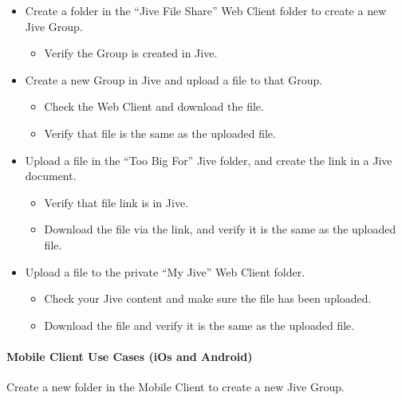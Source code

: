 \documentclass[letterpaper,10pt,english]{sphinxmanual}
\begin{document}
\begin{itemize}
\item {} 
Create a folder in the “Jive File Share” Web Client folder to create a new Jive Group.
\begin{itemize}
\item {} 
Verify the Group is created in Jive.

\end{itemize}

\item {} 
Create a new Group in Jive and upload a file to that Group.
\begin{itemize}
\item {} 
Check the Web Client and download the file.

\item {} 
Verify that file is the same as the uploaded file.

\end{itemize}

\item {} 
Upload a file in the “Too Big For” Jive folder, and create the link in a Jive document.
\begin{itemize}
\item {} 
Verify that file link is in Jive.

\item {} 
Download the file via the link, and verify it is the same as the uploaded file.

\end{itemize}

\item {} 
Upload a file to the private “My Jive” Web Client folder.
\begin{itemize}
\item {} 
Check your Jive content and make sure the file has been uploaded.

\item {} 
Download the file and verify it is the same as the uploaded file.

\end{itemize}

\end{itemize}


\paragraph{Mobile Client Use Cases (iOs and Android)}
\label{enterprise_external_storage/jive_configuration:mobile-client-use-cases-ios-and-android}
Create a new folder in the Mobile Client to create a new Jive Group.
\end{document}
